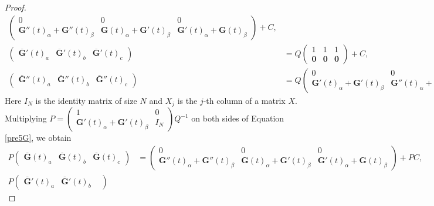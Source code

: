 \documentclass[12pt,reqno]{amsart}
\theoremstyle{definition}
\begin{document}
\begin{proof}
{\begin{equation}
\begin{aligned}
\begin{pmatrix}
0& 0 & 0\\
\mathbf{G}''(t)_{\alpha} + \mathbf{G}''(t)_{\beta} &  
\mathbf{G}(t)_{ \alpha} + \mathbf{G}'(t)_{\beta}& 
\mathbf{G}'(t)_{\alpha} + \mathbf{G}(t)_{\beta} 
\end{pmatrix} + C, \\
\begin{pmatrix}
\overline{\mathbf{G}}'(t)_{a} &
\overline{\mathbf{G}}'(t)_{b} & 
\overline{\mathbf{G}}'(t)_{c} 
\end{pmatrix}
&= Q\begin{pmatrix}
1& 1 & 1\\
\mathbf{0} &  \mathbf{0}& \mathbf{0}
\end{pmatrix} + C, \\
\begin{pmatrix}
\overline{\mathbf{G}}''(t)_{a} &
\overline{\mathbf{G}}''(t)_{b} & 
\overline{\mathbf{G}}''(t)_{c} 
\end{pmatrix}
&= Q \begin{pmatrix}
0& 0 & 0\\
\mathbf{G}'(t)_{\alpha} + \mathbf{G}'(t)_{ \beta} &  
\mathbf{G}''(t)_{ \alpha} + \mathbf{G}(t)_{ \beta}& 
\mathbf{G}(t)_{\alpha} + \mathbf{G}''(t)_{\beta} 
\end{pmatrix} + C  .
\end{aligned}
\end{equation}
}
Here $I_N$ is the identity matrix of size $N$ and $X_{j}$ is the $j$-th column of
a matrix $X$. Multiplying  $P=\begin{pmatrix} 1 & 0 \\
\mathbf{G}'(t)_{\alpha} + \mathbf{G}'(t)_{\beta} & I_N \end{pmatrix} Q^{-1}$ on both
sides of Equation \eqref{pre5G}, we obtain
{\small
\begin{equation}
\label{5G}  
\begin{aligned}
P\begin{pmatrix}
\overline{\mathbf{G}}(t)_{a} &
\overline{\mathbf{G}}(t)_{b} & 
\overline{\mathbf{G}}(t)_{c}
\end{pmatrix}
&= \begin{pmatrix}
0& 0 & 0\\
\mathbf{G}''(t)_{\alpha} + \mathbf{G}''(t)_{\beta} &  
\mathbf{G}(t)_{ \alpha} + \mathbf{G}'(t)_{\beta}& 
\mathbf{G}'(t)_{\alpha} + \mathbf{G}(t)_{\beta} 
\end{pmatrix} + PC, \\
P  \begin{pmatrix}
\overline{\mathbf{G}}'(t)_{a} &
\overline{\mathbf{G}}'(t)_{b} & 

\end{pmatrix}
\end{aligned}
\end{equation}}
\end{proof}
\end{document}
